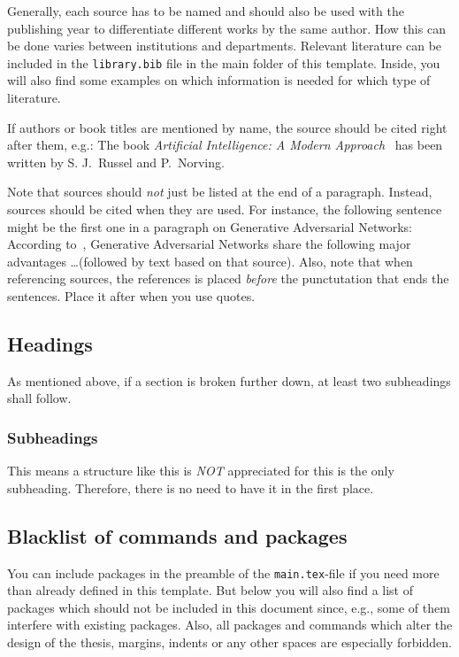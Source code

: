 \documentclass[
    language=english, %
    thesis=bachelor, %
    supervisor=postdoc, %
    multiauthor=false, %
    ]{settings/csssa-thesis}
\begin{document}
Generally, each source has to be named and should also be used with the publishing year to differentiate different works by the same author. How this can be done varies between institutions and departments. Relevant literature can be included in the \texttt{library.bib} file in the main folder of this template. Inside, you will also find some examples on which information is needed for which type of literature.

If authors or book titles are mentioned by name, the source should be cited right after them, e.g.: The book \emph{Artificial Intelligence: A Modern Approach}~\citep{Rusell2003artificial} has been written by S. J.\ Russel and P.\ Norving.

Note that sources should \emph{not} just be listed at the end of a paragraph.  Instead, sources should be cited when they are used. For instance, the following sentence might be the first one in a paragraph on Generative Adversarial Networks: According to~\textcite{Goodfellow2014gan}, Generative Adversarial Networks share the following major advantages \ldots (followed by text based on that source). Also, note that when referencing sources, the references is placed \textit{before} the punctutation that ends the sentences. Place it after when you use quotes. 

\subsection{Headings}
As mentioned above, if a section is broken further down, at least two subheadings shall follow.

\subsubsection{Subheadings}
This means a structure like this is \emph{NOT} appreciated for this is the only subheading. Therefore, there is no need to have it in the first place.

\subsection[Blacklist]{Blacklist of commands and packages}
You can include packages in the preamble of the \texttt{main.tex}-file if you need more than already defined in this template. But below you will also find a list of packages which should not be included in this document since, e.g., some of them interfere with existing packages. Also, all packages and commands which alter the design of the thesis, margins, indents or any other spaces are especially forbidden.
\end{document}
